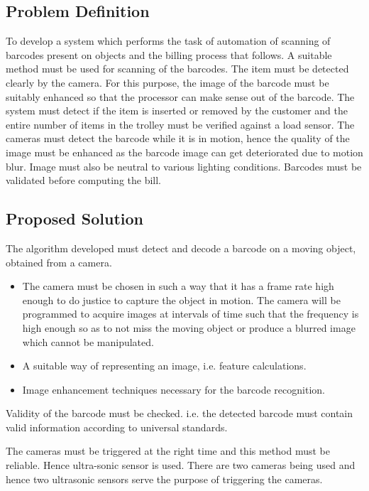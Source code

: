 \documentclass[times, 1pt, a4paper]{article}
\begin{document}
\subsection*{Problem Definition} \label{subsection:problem_definition}

To develop a system which performs the task of automation of scanning of barcodes present on objects and the billing process that follows. A suitable method must be used for scanning of the barcodes. The item must be detected clearly by the camera. For this purpose, the image of the barcode must be suitably enhanced so that the processor can make sense out of the barcode. The system must detect if the item is inserted or removed by the customer and the entire number of items in the trolley must be verified against a load sensor. The cameras must detect the barcode while it is in motion, hence the quality of the image must be enhanced as the barcode image can get deteriorated due to motion blur. Image must also be neutral to various lighting conditions. Barcodes must be validated before computing the bill.

\subsection*{Proposed Solution} \label{subsection:proposed_solution}

The algorithm developed must detect and decode a barcode on a moving object, obtained from a camera.

\begin{itemize}
\item The camera must be chosen in such a way that it has a frame rate high enough to do justice to capture the object in motion. The camera will be programmed to acquire images at intervals of time such that the frequency is high enough so as to not miss the moving object or produce a blurred image which cannot be manipulated.
\item A suitable way of representing an image, i.e. feature calculations.
\item Image enhancement techniques necessary for the barcode recognition.
\end{itemize}

Validity of the barcode must be checked. i.e. the detected barcode must contain valid information according to universal standards.

The cameras must be triggered at the right time and this method must be reliable. Hence ultra-sonic sensor is used. There are two cameras being used and hence two ultrasonic sensors serve the purpose of triggering the cameras.
\end{document}
